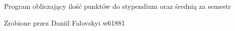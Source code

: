 \label{index_md_F___WSIZ_Projekt_Kalkulator_stypendium_PunktyStypendium_SredniaSemestralna_readme}%
 Program obliczający ilość punktów do stypendium oraz średnią za semestr

Zrobione przez Daniil Falovskyi w61881 